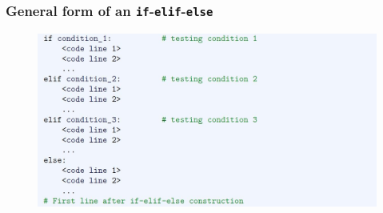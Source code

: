 \documentclass[english,14pt]{beamer}
\begin{document}

\begin{frame}[fragile]

\frametitle{General form of an \texttt{if}-\texttt{elif}-\texttt{else}}

\begin{figure}[ht]
	\centering
	\includegraphics[width=\textwidth]{figures/LLp70a}
\end{figure}

\end{frame}

%
%
%
%

\end{document}
